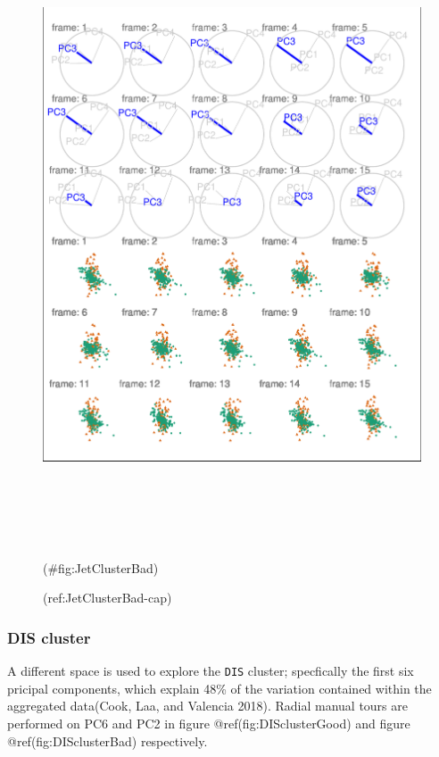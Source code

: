 \begin{Schunk}
\begin{figure}

{\centering \includegraphics[width=6in,height=7.2in]{spinifex_paper_files/figure-latex/JetClusterBad-1} 

}

\caption[(ref:JetClusterBad-cap)]{(ref:JetClusterBad-cap)}(\#fig:JetClusterBad)
\end{figure}
\end{Schunk}

\hypertarget{dis-cluster}{%
\subsubsection{DIS cluster}\label{dis-cluster}}

A different space is used to explore the \texttt{DIS} cluster; specfically the first six pricipal components, which explain 48\% of the variation contained within the aggregated data(Cook, Laa, and Valencia 2018). Radial manual tours are performed on PC6 and PC2 in figure @ref(fig:DISclusterGood) and figure @ref(fig:DISclusterBad) respectively.

